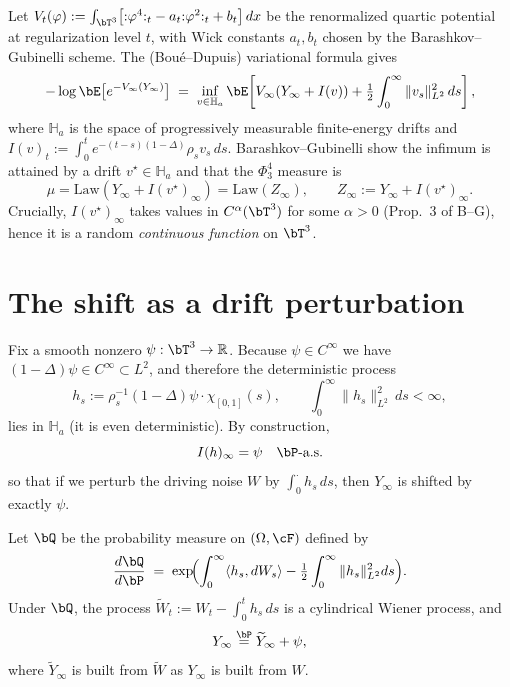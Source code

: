 Let $V_t(\varphi) := \int_{\bT^3} \bigl[ {:}\varphi^4{:}_t - a_t {:}\varphi^2{:}_t + b_t\bigr]\,dx$ be the renormalized quartic potential at regularization level $t$, with Wick constants $a_t,b_t$ chosen by the Barashkov--Gubinelli scheme. The (Boué--Dupuis) variational formula gives
\begin{equation}\label{eq:BG}
  -\log \bE\bigl[e^{-V_\infty(Y_\infty)}\bigr] \;=\; \inf_{v\in \mathbb{H}_a} \bE\!\left[ V_\infty(Y_\infty + I(v)) + \tfrac12\int_0^\infty \|v_s\|_{L^2}^2\,ds\right],
\end{equation}
where $\mathbb{H}_a$ is the space of progressively measurable finite-energy drifts and $I(v)_t := \int_0^t e^{-(t-s)(1-\Delta)}\rho_s v_s\,ds$. Barashkov--Gubinelli show the infimum is attained by a drift $v^\star\in \mathbb{H}_a$ and that the $\Phi^4_3$ measure is
\[
   \mu = \mathrm{Law}(Y_\infty + I(v^\star)_\infty) = \mathrm{Law}(Z_\infty),\qquad Z_\infty := Y_\infty + I(v^\star)_\infty.
\]
Crucially, $I(v^\star)_\infty$ takes values in $C^\alpha(\bT^3)$ for some $\alpha>0$ (Prop.~3 of B--G), hence it is a random \emph{continuous function} on $\bT^3$.

\section{The shift as a drift perturbation}

Fix a smooth nonzero $\psi:\bT^3\to\bR$. Because $\psi\in C^\infty$ we have $(1-\Delta)\psi \in C^\infty \subset L^2$, and therefore the deterministic process
\[
   h_s := \rho_s^{-1}(1-\Delta)\psi \cdot \chi_{[0,1]}(s),\qquad \int_0^\infty \|h_s\|_{L^2}^2\,ds < \infty,
\]
lies in $\mathbb{H}_a$ (it is even deterministic). By construction,
\[
   I(h)_\infty = \psi\quad \bP\text{-a.s.}
\]
so that if we perturb the driving noise $W$ by $\int_0^\cdot h_s\,ds$, then $Y_\infty$ is shifted by exactly $\psi$.

\begin{lemma}[Girsanov]\label{lem:girsanov}
Let $\bQ$ be the probability measure on $(\Omega,\cF)$ defined by
\[
   \frac{d\bQ}{d\bP} \;=\; \exp\!\Bigl(\int_0^\infty \langle h_s, dW_s\rangle - \tfrac12\int_0^\infty \|h_s\|_{L^2}^2 ds\Bigr).
\]
Under $\bQ$, the process $\widetilde W_t := W_t - \int_0^t h_s\,ds$ is a cylindrical Wiener process, and
\[
   Y_\infty \stackrel{\bP}{=} \widetilde Y_\infty + \psi,
\]
where $\widetilde Y_\infty$ is built from $\widetilde W$ as $Y_\infty$ is built from $W$.
\end{lemma}

